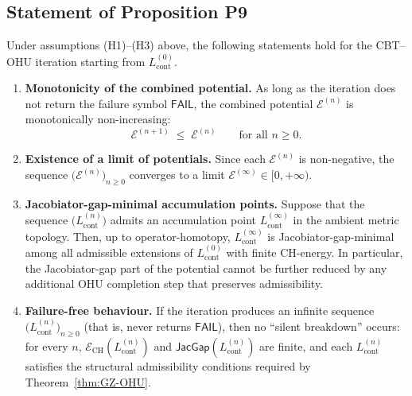 \documentclass[11pt]{book}
\theoremstyle{plain}
\theoremstyle{definition}
\begin{document}
\subsection*{Statement of Proposition P9}


\begin{proposition}
\label{prop:CBT-OHU-monotone}
Under assumptions \textnormal{(H1)}–\textnormal{(H3)} above, the
following statements hold for the CBT--OHU iteration starting from
\(L_{\mathrm{cont}}^{(0)}\).

\begin{enumerate}
  \item[\textnormal{(1)}] \textbf{Monotonicity of the combined
        potential.}
    As long as the iteration does not return the failure symbol
    \(\mathsf{FAIL}\), the combined potential
    \(\mathcal{E}^{(n)}\) is monotonically non-increasing:
    \[
      \mathcal{E}^{(n+1)}
      \;\le\;
      \mathcal{E}^{(n)}
      \qquad\text{for all } n\ge 0.
    \]
  \item[\textnormal{(2)}] \textbf{Existence of a limit of potentials.}
    Since each \(\mathcal{E}^{(n)}\) is non-negative, the sequence
    \(\bigl(\mathcal{E}^{(n)}\bigr)_{n\ge 0}\) converges to a limit
    \(\mathcal{E}^{(\infty)}\in[0,+\infty)\).
  \item[\textnormal{(3)}] \textbf{Jacobiator-gap-minimal accumulation
        points.}
    Suppose that the sequence \(\bigl(L_{\mathrm{cont}}^{(n)}\bigr)\)
    admits an accumulation point \(L_{\mathrm{cont}}^{(\infty)}\) in
    the ambient metric topology.  Then, up to operator-homotopy,
    \(L_{\mathrm{cont}}^{(\infty)}\) is Jacobiator-gap-minimal among
    all admissible extensions of \(L_{\mathrm{cont}}^{(0)}\) with
    finite CH-energy.  In particular, the Jacobiator-gap part of the
    potential cannot be further reduced by any additional OHU
    completion step that preserves admissibility.
  \item[\textnormal{(4)}] \textbf{Failure-free behaviour.}
    If the iteration produces an infinite sequence
    \(\bigl(L_{\mathrm{cont}}^{(n)}\bigr)_{n\ge 0}\) (that is, never
    returns \(\mathsf{FAIL}\)), then no ``silent breakdown'' occurs:
    for every \(n\),
    \(\mathcal{E}_{\mathrm{CH}}(L_{\mathrm{cont}}^{(n)})\) and
    \(\mathsf{JacGap}(L_{\mathrm{cont}}^{(n)})\) are finite, and
    each \(L_{\mathrm{cont}}^{(n)}\) satisfies the structural
    admissibility conditions required by Theorem~\ref{thm:GZ-OHU}.
\end{enumerate}
\end{proposition}
\end{document}
